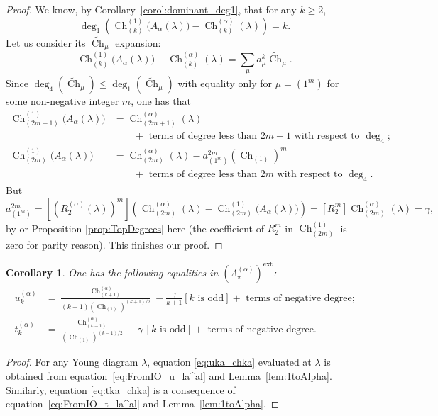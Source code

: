 \documentclass[11pt]{amsart}
\theoremstyle{plain}
\newtheorem{corollary}[lemma]{Corollary}
\theoremstyle{remark}
\newcommand{\Polaext}{\left(\Lambda_\star^{(\alpha)}\right)^{\ext}}
\DeclareMathOperator{\Ch}{Ch}
\DeclareMathOperator{\ext}{ext}
\begin{document}
\begin{proof}
    We know, by Corollary~\ref{corol:dominant_deg1}, that for any $k \geq 2$,
    \[ \deg_1\left(\Ch^{(1)}_{(k)}\big(A_\alpha(\lambda)\big) - \Ch^{(\alpha)}_{(k)}(\lambda)\right) = k.\]
Let us consider its $\widetilde{\Ch}_\mu$ expansion:
\[ \Ch^{(1)}_{(k)}\big(A_\alpha(\lambda)\big) - \Ch^{(\alpha)}_{(k)}(\lambda) = \sum_\mu a^k_\mu \widetilde{\Ch}_\mu.\]
Since $\deg_4(\widetilde{\Ch}_\mu) \leq \deg_1(\widetilde{\Ch}_\mu)$ with equality only for $\mu = (1^m)$
for some non-negative integer $m$, one has that
\begin{align*}
    \Ch^{(1)}_{(2m+1)}\big(A_\alpha(\lambda)\big) &= \Ch^{(\alpha)}_{(2m+1)}(\lambda) 
    \\&\qquad+ \text{ terms of degree less than }
    2m+1\text{ with respect to }\deg_4;   \\
        \Ch^{(1)}_{(2m)}\big(A_\alpha(\lambda)\big)& 
        = \Ch^{(\alpha)}_{(2m)}(\lambda) - a^{2m}_{(1^m)}\left(\Ch_{(1)}\right)^m
        \\&\qquad + \text{ terms of degree less than }
    2m\text{ with respect to }\deg_4. \
\end{align*}
But 
\[ a^{2m}_{(1^m)} = [\left(R^{(\alpha)}_2(\lambda)\right)^m] \left(\Ch^{(\alpha)}_{(2m)}(\lambda)
- \Ch^{(1)}_{(2m)}\big(A_\alpha(\lambda)\big)\right) = [R_2^m]\Ch^{(\alpha)}_{(2m)}(\lambda) = \gamma,\]
by \cite[Theorem 10.3]{Lassalle2009} or Proposition \ref{prop:TopDegrees} here
(the coefficient of $R_2^m$ in $\Ch^{(1)}_{(2m)}$ is zero for parity reason).
This finishes our proof.
\end{proof}

\begin{corollary}
    \label{corol:uktk_chka}
One has the following equalities in $\Polaext$:
\begin{align}
    u_{k}^{(\alpha)} &= 
    \frac{\Ch^{(\alpha)}_{(k+1)}}{(k+1) \left(\Ch_{(1)}\right)^{(k+1)/2}}  - \frac{\gamma}{k+1} [k\text{ is odd}]
    +\text{ terms of negative degree;}
    \label{eq:uka_chka}\\
    t_{k}^{(\alpha)} &= \frac{\Ch^{(\alpha)}_{(k-1)} }{\left(\Ch_{(1)}\right)^{(k-1)/2}} - \gamma \, [k\text{ is odd}]
    +\text{ terms of negative degree.}
    \label{eq:tka_chka}
\end{align}
\end{corollary}
\begin{proof}
    For any Young diagram $\lambda$,
    equation \eqref{eq:uka_chka} evaluated at $\lambda$
    is obtained from equation~\eqref{eq:FromIO_u_la^al} and Lemma~\ref{lem:1toAlpha}.
    Similarly, equation \eqref{eq:tka_chka} is a consequence of equation~\eqref{eq:FromIO_t_la^al}
     and Lemma~\ref{lem:1toAlpha}.
\end{proof}
\end{document}
